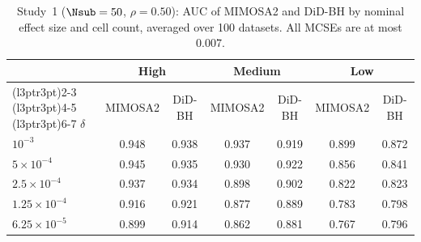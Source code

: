 \begin{table}[!h]
\centering
\caption{\label{tab:base-auc}Study~1 ($\Nsub = 50$, $\rho = 0.50$): AUC of MIMOSA2 and DiD-BH by nominal effect size and cell count, averaged over 100 datasets. All MCSEs are at most 0.007.}
\centering
\begin{tabular}[t]{lcccccc}
\toprule
\multicolumn{1}{c}{ } & \multicolumn{2}{c}{High} & \multicolumn{2}{c}{Medium} & \multicolumn{2}{c}{Low} \\
\cmidrule(l{3pt}r{3pt}){2-3} \cmidrule(l{3pt}r{3pt}){4-5} \cmidrule(l{3pt}r{3pt}){6-7}
$\delta$ & MIMOSA2 & DiD-BH & MIMOSA2 & DiD-BH & MIMOSA2 & DiD-BH\\
\midrule
$10^{-3}$ & 0.948 & 0.938 & 0.937 & 0.919 & 0.899 & 0.872\\
$5\times10^{-4}$ & 0.945 & 0.935 & 0.930 & 0.922 & 0.856 & 0.841\\
$2.5\times10^{-4}$ & 0.937 & 0.934 & 0.898 & 0.902 & 0.822 & 0.823\\
$1.25\times10^{-4}$ & 0.916 & 0.921 & 0.877 & 0.889 & 0.783 & 0.798\\
$6.25\times10^{-5}$ & 0.899 & 0.914 & 0.862 & 0.881 & 0.767 & 0.796\\
\bottomrule
\end{tabular}
\end{table}
